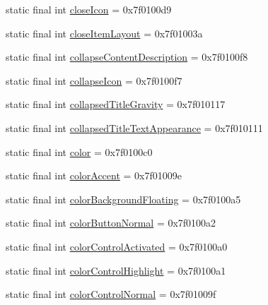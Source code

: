 \begin{CompactItemize}
\item 
static final int \hyperlink{classandroid_1_1support_1_1v7_1_1cardview_1_1_r_1_1attr_67b45a3be19fdf4f3c2628343d8ca619}{closeIcon} = 0x7f0100d9
\item 
static final int \hyperlink{classandroid_1_1support_1_1v7_1_1cardview_1_1_r_1_1attr_1ad4c0e393f0c9e7d47f39828055da0c}{closeItemLayout} = 0x7f01003a
\item 
static final int \hyperlink{classandroid_1_1support_1_1v7_1_1cardview_1_1_r_1_1attr_39700ed3911f5eb54176f7a1f569c5c1}{collapseContentDescription} = 0x7f0100f8
\item 
static final int \hyperlink{classandroid_1_1support_1_1v7_1_1cardview_1_1_r_1_1attr_98ecebc6ad805eec7bda4b28cfd6f6cc}{collapseIcon} = 0x7f0100f7
\item 
static final int \hyperlink{classandroid_1_1support_1_1v7_1_1cardview_1_1_r_1_1attr_5236503c38abc0fd69cd9c9be77f5a3d}{collapsedTitleGravity} = 0x7f010117
\item 
static final int \hyperlink{classandroid_1_1support_1_1v7_1_1cardview_1_1_r_1_1attr_45f3b12ece98c9725d8ada72b4c0fdfc}{collapsedTitleTextAppearance} = 0x7f010111
\item 
static final int \hyperlink{classandroid_1_1support_1_1v7_1_1cardview_1_1_r_1_1attr_0039a2c5c5dc619d894dddb72f1d2fc2}{color} = 0x7f0100c0
\item 
static final int \hyperlink{classandroid_1_1support_1_1v7_1_1cardview_1_1_r_1_1attr_ced545cf60fb56f4321d795748e996d9}{colorAccent} = 0x7f01009e
\item 
static final int \hyperlink{classandroid_1_1support_1_1v7_1_1cardview_1_1_r_1_1attr_55eb67619a2be1f7e49f5d5fd5ed70d1}{colorBackgroundFloating} = 0x7f0100a5
\item 
static final int \hyperlink{classandroid_1_1support_1_1v7_1_1cardview_1_1_r_1_1attr_2c96f008bcdb10343244b9e8ab342e60}{colorButtonNormal} = 0x7f0100a2
\item 
static final int \hyperlink{classandroid_1_1support_1_1v7_1_1cardview_1_1_r_1_1attr_c00947e055ae13ea921ba0212d620dce}{colorControlActivated} = 0x7f0100a0
\item 
static final int \hyperlink{classandroid_1_1support_1_1v7_1_1cardview_1_1_r_1_1attr_771b92b1ebd9feca55f96821dee0627d}{colorControlHighlight} = 0x7f0100a1
\item 
static final int \hyperlink{classandroid_1_1support_1_1v7_1_1cardview_1_1_r_1_1attr_3d26617c821bec1a971f3524d13bd48c}{colorControlNormal} = 0x7f01009f
\item 

\end{CompactItemize}
